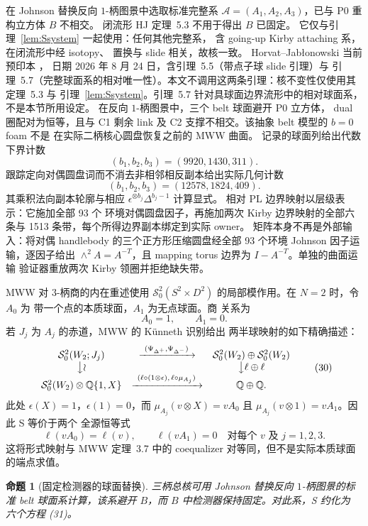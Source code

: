 \documentclass[11pt]{amsart}
\newtheorem{proposition}[theorem]{命题}
\theoremstyle{definition}
\theoremstyle{remark}
\newcommand{\Q}{\mathbb{Q}}
\begin{document}
在 Johnson 替换反向
$1$-柄图景中选取标准完整系
\(\mathcal A=(A_1,A_2,A_3)\)，已与 P0 重构立方体 $B$ 不相交。
闭流形 HJ 定理~5.3 不用于得出 $B$ 已固定。
它仅与引理~\ref{lem:Ssystem} 一起使用：任何其他完整系，
含 going-up Kirby attaching 系，在闭流形中经 isotopy、
置换与 slide 相关，故核一致。
Horvat--Jab\l{}onowski 当前预印本 \cite{HorvatJablonowski2025}，
日期 2026 年 8 月 24 日，含引理~5.5（带点子球 slide 引理）与
引理~5.7（完整球面系的相对唯一性）。本文不调用这两条引理：核不变性仅使用其定理~5.3 与
引理~\ref{lem:Ssystem}。引理~5.7 针对具球面边界流形中的相对球面系，不是本节所用设定。
在反向 $1$-柄图景中，三个 belt 球面避开 P0 立方体，
dual 圈配对为恒等，且与 C1 剩余 link 及 C2 支撑不相交。该抽象 belt 模型的 $b=0$ foam 不是
在实际二柄核心圆盘恢复之前的 MWW 曲面。
记录的球面列给出代数下界计数
\[
(b_1,b_2,b_3)=(9920,1430,311).
\]
跟踪定向对偶圆盘词而不消去非相邻相反副本给出实际几何计数
\[
(b_1,b_2,b_3)=(12578,1824,409).
\]
其乘积法向副本轮廓与相应
$\epsilon^{\otimes b_j}\Delta^{b_j-1}$ 计算显式。
相对 PL 边界映射以层级表示：它施加全部 93 个
环境对偶圆盘因子，再施加两次 Kirby 边界映射的全部六条与 1513 条带，每个所得边界副本绑定到实际 owner。
矩阵本身不再是外部输入：将对偶 handlebody 的三个正方形压缩圆盘经全部 93 个环境
Johnson 因子运输，逐因子给出 $\wedge^2A=A^{-T}$，且
mapping torus 边界为 $I-A^{-T}$。单独的曲面运输
验证器重放两次 Kirby 领圈并拒绝缺失带。

MWW 对 $3$-柄商的内在重述使用
$\mathcal S^2_0(S^2\times D^2)$ 的局部模作用。在 $N=2$ 时，令 $A_0$ 为
带一个点的本质球面，$A_1$ 为无点球面。商
关系为
\[
A_0=1,\qquad A_1=0.
\]
若 $J_j$ 为 $A_j$ 的赤道，MWW 的 K\"unneth 识别给出
两半球映射的如下精确描述：
\[
\begin{array}{ccc}
\mathcal S^2_0(W_2;J_j)&\xrightarrow{\ (\Psi_{\Delta^+},\Psi_{\Delta^-})\ }&
\mathcal S^2_0(W_2)\oplus\mathcal S^2_0(W_2)\\
\big\downarrow\wr&&\big\downarrow{\ell\oplus\ell}\\
\mathcal S^2_0(W_2)\otimes\Q\{1,X\}
&\xrightarrow{\ (\ell\circ(1\otimes\epsilon),\,\ell\circ\mu_{A_j})\ }&
\Q\oplus\Q.
\end{array}
\tag{30}
\]
此处 $\epsilon(X)=1$，$\epsilon(1)=0$，而
$\mu_{A_j}(v\otimes X)=vA_0$ 且
$\mu_{A_j}(v\otimes1)=vA_1$。因此 S 等价于两个
全源恒等式
\[
\ell(vA_0)=\ell(v),\qquad \ell(vA_1)=0
\quad\text{对每个 }v\text{ 及 }j=1,2,3.
\tag{31}
\]
这将形式映射与 MWW
定理~3.7 中的 coequalizer 对等同，但不是实际本质球面的端点求值。

\begin{proposition}[固定检测器的球面替换]\label{thm:Sgeometry}
三柄总核可用 Johnson 替换反向 $1$-柄图景的标准 belt 球面系计算，该系避开
$B$，而 $B$ 中检测器保持固定。对此系，S 约化为
六个方程 (31)。
\end{proposition}
\end{document}
